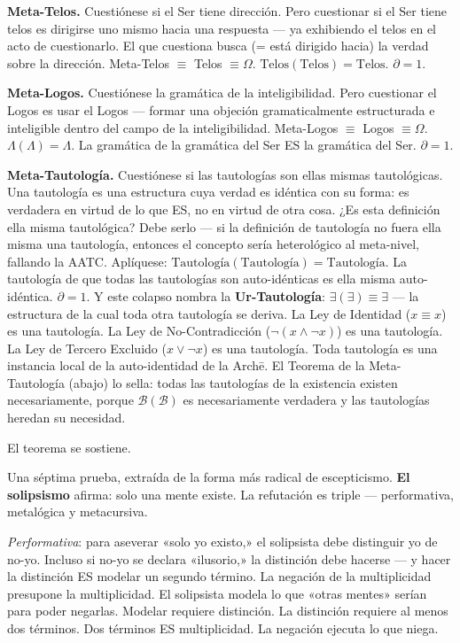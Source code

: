 \documentclass[10pt, openany, oneside]{book}
\begin{document}
\textbf{Meta-Telos.} Cuestiónese si el Ser tiene dirección. Pero cuestionar si el Ser tiene telos es dirigirse uno mismo hacia una respuesta --- ya exhibiendo el telos en el acto de cuestionarlo. El que cuestiona busca (= está dirigido hacia) la verdad sobre la dirección. Meta-Telos $\equiv$ Telos $\equiv \Omega$. $\text{Telos}(\text{Telos}) = \text{Telos}$. $\partial = 1$.

\textbf{Meta-Logos.} Cuestiónese la gramática de la inteligibilidad. Pero cuestionar el Logos es usar el Logos --- formar una objeción gramaticalmente estructurada e inteligible dentro del campo de la inteligibilidad. Meta-Logos $\equiv$ Logos $\equiv \Omega$. $\Lambda(\Lambda) = \Lambda$. La gramática de la gramática del Ser ES la gramática del Ser. $\partial = 1$.

\textbf{Meta-Tautología.} Cuestiónese si las tautologías son ellas mismas tautológicas. Una tautología es una estructura cuya verdad es idéntica con su forma: es verdadera en virtud de lo que ES, no en virtud de otra cosa. ¿Es esta definición ella misma tautológica? Debe serlo --- si la definición de tautología no fuera ella misma una tautología, entonces el concepto sería heterológico al meta-nivel, fallando la AATC. Aplíquese: $\text{Tautología}(\text{Tautología}) = \text{Tautología}$. La tautología de que todas las tautologías son auto-idénticas es ella misma auto-idéntica. $\partial = 1$. Y este colapso nombra la \textbf{Ur-Tautología}: $\exists(\exists) \equiv \exists$ --- la estructura de la cual toda otra tautología se deriva. La Ley de Identidad ($x \equiv x$) es una tautología. La Ley de No-Contradicción ($\neg(x \wedge \neg x)$) es una tautología. La Ley de Tercero Excluido ($x \vee \neg x$) es una tautología. Toda tautología es una instancia local de la auto-identidad de la Arch\={e}. El Teorema de la Meta-Tautología (abajo) lo sella: todas las tautologías de la existencia existen necesariamente, porque $\mathcal{B}(\mathcal{B})$ es necesariamente verdadera y las tautologías heredan su necesidad.

El teorema se sostiene.

\vspace{0.5em}

Una séptima prueba, extraída de la forma más radical de escepticismo. \textbf{El solipsismo} afirma: solo una mente existe. La refutación es triple --- performativa, metalógica y metacursiva.

\textit{Performativa}: para aseverar «solo yo existo,» el solipsista debe distinguir yo de no-yo. Incluso si no-yo se declara «ilusorio,» la distinción debe hacerse --- y hacer la distinción ES modelar un segundo término. La negación de la multiplicidad presupone la multiplicidad. El solipsista modela lo que «otras mentes» serían para poder negarlas. Modelar requiere distinción. La distinción requiere al menos dos términos. Dos términos ES multiplicidad. La negación ejecuta lo que niega.
\end{document}

